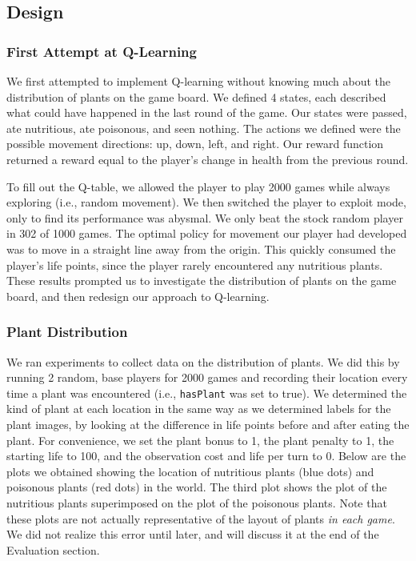 \documentclass[solution, letterpaper]{cs121}
\begin{document}
\subsection{Design}
\subsubsection{First Attempt at Q-Learning}
\hspace{4mm} We first attempted to implement Q-learning without knowing much about the distribution of plants on the game board. We defined 4 states, each described what could have happened in the last round of the game. Our states were {\sc passed}, {\sc ate nutritious}, {\sc ate poisonous}, and {\sc seen nothing}. The actions we defined were the possible movement directions: {\sc up}, {\sc down}, {\sc left}, and {\sc right}. Our reward function returned a reward equal to the player's change in health from the previous round.

To fill out the Q-table, we allowed the player to play 2000 games while always exploring (i.e., random movement). We then switched the player to exploit mode, only to find its performance was abysmal. We only beat the stock random player in 302 of 1000 games. The optimal policy for movement our player had developed was to move in a straight line away from the origin. This quickly consumed the player's life points, since the player rarely encountered any nutritious plants. These results prompted us to investigate the distribution of plants on the game board, and then redesign our approach to Q-learning.

\subsubsection{Plant Distribution}
\hspace{4mm} We ran experiments to collect data on the distribution of plants. We did this by running 2 random, base players for 2000 games and recording their location every time a plant was encountered (i.e., {\tt hasPlant} was set to true). We determined the kind of plant at each location in the same way as we determined labels for the plant images, by looking at the difference in life points before and after eating the plant. For convenience, we set the plant bonus to 1, the plant penalty to 1, the starting life to 100, and the observation cost and life per turn to 0. Below are the plots we obtained showing the location of nutritious plants (blue dots) and poisonous plants (red dots) in the world. The third plot shows the plot of the nutritious plants superimposed on the plot of the poisonous plants. Note that these plots are not actually representative of the layout of plants \emph{in each game}. We did not realize this error until later, and will discuss it at the end of the Evaluation section.
\end{document}

